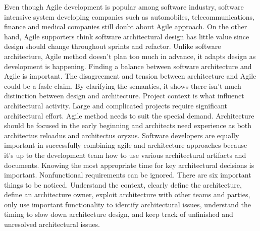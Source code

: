 \documentclass[12pt,letterpaper,boxed]{hmcpset}
\begin{document}
\begin{problem}
\end{problem}
Even though Agile development is popular among software industry, software intensive system developing companies such as automobiles, telecommunications, finance and medical companies still doubt about Agile approach. On the other hand, Agile supporters think software architectural design has little value since design should change throughout sprints and refactor. \newline
Unlike software architecture, Agile method doesn't plan too much in advance, it adapts design as development is happening. Finding a balance between software architecture and Agile is important.\newline
The disagreement and tension between architecture and Agile could be a fasle claim.\newline
By clarifying the semantics, it shows there isn't much distinction between design and architecture. Project context is what influenct architectural activity. Large and complicated projects require significant architectural effort. Agile method needs to suit the special demand. \newline
Architecture should be focused in the early beginning and architects need experience as both architectus reloadus and architectus oryzus. \newline
Software developers are equally important in successfully combining agile and architecture approaches because it’s up to the development team how to use various architectural artifacts and documents.\newline
Knowing the most appropriate time for key architectural decisions is important. Nonfunctional requirements can be ignored. \newline
There are six important things to be noticed.\newline
Understand the context, clearly define the architecture, define an architecture owner, exploit architecture with other teams and parties, only use important functionality to identify architectural issues, understand the timing to slow down architecture design, and keep track of unfinished and unresolved architectural issues.\newline
\end{document}
